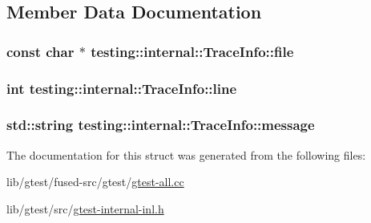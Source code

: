 \subsection{Member Data Documentation}
\hypertarget{structtesting_1_1internal_1_1_trace_info_affad3e5ecae450b368073ee33a115fee}{
\subsubsection[{file}]{\setlength{\rightskip}{0pt plus 5cm}const char $\ast$ testing\-::internal\-::\-Trace\-Info\-::file}}\label{structtesting_1_1internal_1_1_trace_info_affad3e5ecae450b368073ee33a115fee}
\hypertarget{structtesting_1_1internal_1_1_trace_info_ae9d269de1b77f4a3180d0d34acb4d7ff}{
\subsubsection[{line}]{\setlength{\rightskip}{0pt plus 5cm}int testing\-::internal\-::\-Trace\-Info\-::line}}\label{structtesting_1_1internal_1_1_trace_info_ae9d269de1b77f4a3180d0d34acb4d7ff}
\hypertarget{structtesting_1_1internal_1_1_trace_info_a39e74f39ce6d5fdbac799abdb1c27f90}{
\subsubsection[{message}]{\setlength{\rightskip}{0pt plus 5cm}std\-::string testing\-::internal\-::\-Trace\-Info\-::message}}\label{structtesting_1_1internal_1_1_trace_info_a39e74f39ce6d5fdbac799abdb1c27f90}


The documentation for this struct was generated from the following files\-:\begin{DoxyCompactItemize}
\item 
lib/gtest/fused-\/src/gtest/\hyperlink{fused-src_2gtest_2gtest-all_8cc}{gtest-\/all.\-cc}\item 
lib/gtest/src/\hyperlink{gtest-internal-inl_8h}{gtest-\/internal-\/inl.\-h}\end{DoxyCompactItemize}
